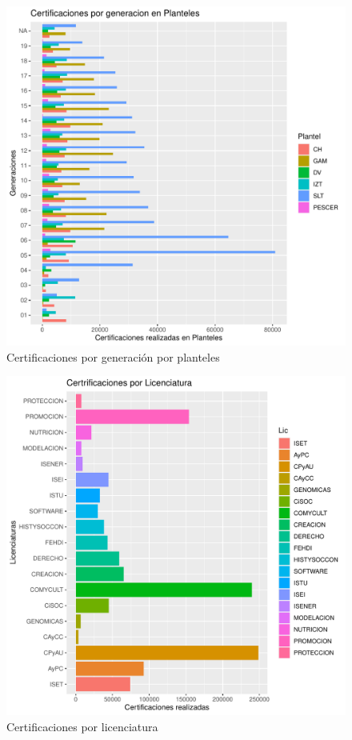 \documentclass[12pt]{article}
\begin{document}
\begin{figure}
\centering
\includegraphics[scale=0.45]{Graficas/ggplotBarplotGenPlantel2.pdf}
\caption{Certificaciones por generaci\'on por planteles}
\label{Fig.Cert.Gen-Plantel2}
\end{figure}

\begin{figure}
\centering
\includegraphics[scale=0.45]{Graficas/ggplotBarplotLic.pdf}
\caption{Certificaciones por licenciatura}
\label{Fig.Cert.Licenciatura}
\end{figure}
\end{document}
